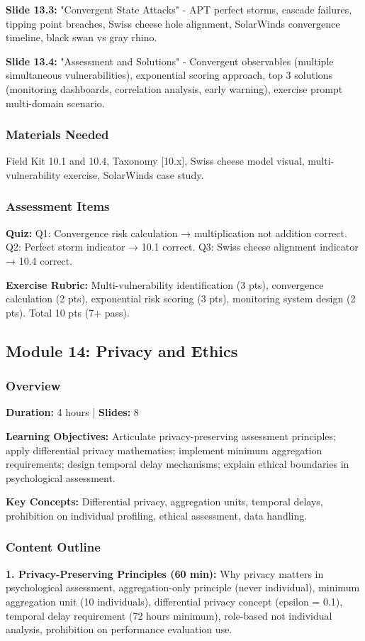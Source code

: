 \documentclass[11pt,a4paper]{article}
\begin{document}
\textbf{Slide 13.3:} "Convergent State Attacks" - APT perfect storms, cascade failures, tipping point breaches, Swiss cheese hole alignment, SolarWinds convergence timeline, black swan vs gray rhino.

\textbf{Slide 13.4:} "Assessment and Solutions" - Convergent observables (multiple simultaneous vulnerabilities), exponential scoring approach, top 3 solutions (monitoring dashboards, correlation analysis, early warning), exercise prompt multi-domain scenario.

\subsubsection{Materials Needed}
Field Kit 10.1 and 10.4, Taxonomy [10.x], Swiss cheese model visual, multi-vulnerability exercise, SolarWinds case study.

\subsubsection{Assessment Items}
\textbf{Quiz:} Q1: Convergence risk calculation → multiplication not addition correct. Q2: Perfect storm indicator → 10.1 correct. Q3: Swiss cheese alignment indicator → 10.4 correct.

\textbf{Exercise Rubric:} Multi-vulnerability identification (3 pts), convergence calculation (2 pts), exponential risk scoring (3 pts), monitoring system design (2 pts). Total 10 pts (7+ pass).

\subsection{Module 14: Privacy and Ethics}

\subsubsection{Overview}
\textbf{Duration:} 4 hours | \textbf{Slides:} 8

\textbf{Learning Objectives:} Articulate privacy-preserving assessment principles; apply differential privacy mathematics; implement minimum aggregation requirements; design temporal delay mechanisms; explain ethical boundaries in psychological assessment.

\textbf{Key Concepts:} Differential privacy, aggregation units, temporal delays, prohibition on individual profiling, ethical assessment, data handling.

\subsubsection{Content Outline}
\textbf{1. Privacy-Preserving Principles (60 min):} Why privacy matters in psychological assessment, aggregation-only principle (never individual), minimum aggregation unit (10 individuals), differential privacy concept (epsilon = 0.1), temporal delay requirement (72 hours minimum), role-based not individual analysis, prohibition on performance evaluation use.
\end{document}
